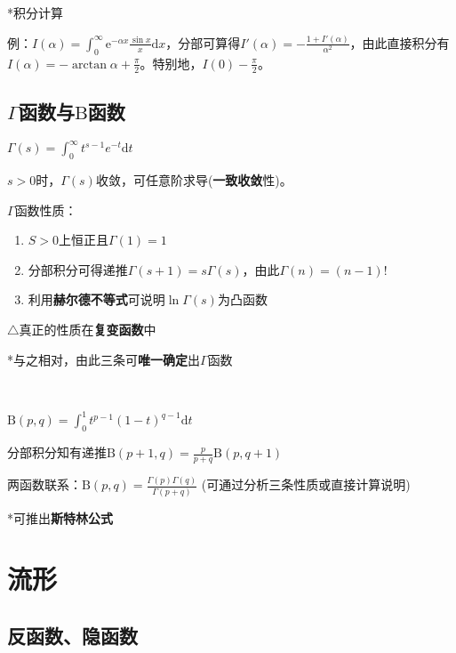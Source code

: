 \documentclass[a4paper,UTF8]{ctexart}
\begin{document}
*积分计算

例：$I(\alpha)=\int_0^\infty\mathrm{e}^{-\alpha x}\frac{\sin{x}}{x}\mathrm{d}x$，分部可算得$I'(\alpha)=-\frac{1+I'(\alpha)}{\alpha^2}$，由此直接积分有$I(\alpha)=-\arctan\alpha+\frac{\pi}{2}$。特别地，$I(0)-\frac{\pi}{2}$。

\subsection{$\Gamma$函数与$\mathrm{B}$函数}
$\Gamma(s)=\int_0^\infty t^{s-1}e^{-t}\mathrm{d}t$

$s>0$时，$\Gamma(s)$收敛，可任意阶求导(\textbf{一致收敛}性)。

$\Gamma$函数性质：
\begin{enumerate}
	\item $S>0$上恒正且$\Gamma(1)=1$
	\item 分部积分可得递推$\Gamma(s+1)=s\Gamma(s)$，由此$\Gamma(n)=(n-1)!$
	\item 利用\textbf{赫尔德不等式}可说明$\ln\Gamma(s)$为凸函数
\end{enumerate}

$\triangle$真正的性质在\textbf{复变函数}中

*与之相对，由此三条可\textbf{唯一确定}出$\Gamma$函数

~

$\mathrm{B}(p,q)=\int_0^1t^{p-1}(1-t)^{q-1}\mathrm{d}t$

分部积分知有递推$\mathrm{B}(p+1,q)=\frac{p}{p+q}\mathrm{B}(p,q+1)$

两函数联系：$\mathrm{B}(p,q)=\frac{\Gamma(p)\Gamma(q)}{\Gamma(p+q)}$ (可通过分析三条性质或直接计算说明)

*可推出\textbf{斯特林公式}

\section{流形}
\subsection{反函数、隐函数}
\end{document}
